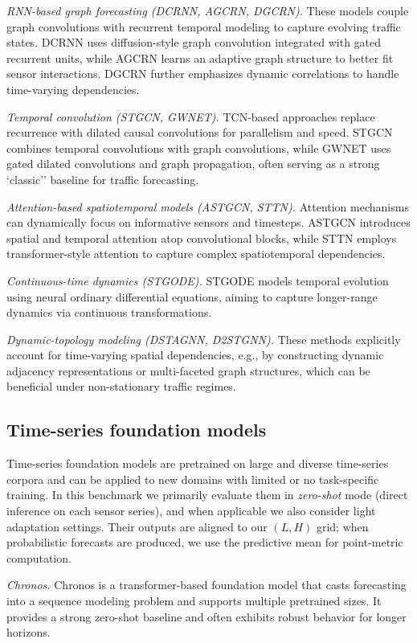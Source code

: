 \documentclass[10pt]{article}
\begin{document}
\textit{RNN-based graph forecasting (DCRNN, AGCRN, DGCRN).}
These models couple graph convolutions with recurrent temporal modeling to capture evolving traffic states.
DCRNN uses diffusion-style graph convolution integrated with gated recurrent units, while AGCRN learns an
adaptive graph structure to better fit sensor interactions. DGCRN further emphasizes dynamic correlations to
handle time-varying dependencies.

\textit{Temporal convolution (STGCN, GWNET).}
TCN-based approaches replace recurrence with dilated causal convolutions for parallelism and speed.
STGCN combines temporal convolutions with graph convolutions, while GWNET uses gated dilated convolutions
and graph propagation, often serving as a strong `classic'' baseline for traffic forecasting.

\textit{Attention-based spatiotemporal models (ASTGCN, STTN).}
Attention mechanisms can dynamically focus on informative sensors and timesteps.
ASTGCN introduces spatial and temporal attention atop convolutional blocks, while STTN employs transformer-style
attention to capture complex spatiotemporal dependencies.

\textit{Continuous-time dynamics (STGODE).}
STGODE models temporal evolution using neural ordinary differential equations, aiming to capture longer-range
dynamics via continuous transformations.

\textit{Dynamic-topology modeling (DSTAGNN, D2STGNN).}
These methods explicitly account for time-varying spatial dependencies, e.g., by constructing dynamic adjacency
representations or multi-faceted graph structures, which can be beneficial under non-stationary traffic regimes.

\subsection{Time-series foundation models}
Time-series foundation models are pretrained on large and diverse time-series corpora and can be applied to
new domains with limited or no task-specific training. In this benchmark we primarily evaluate them in
\emph{zero-shot} mode (direct inference on each sensor series), and when applicable we also consider light
adaptation settings. Their outputs are aligned to our $(L,H)$ grid; when probabilistic forecasts are produced,
we use the predictive mean for point-metric computation.

\textit{Chronos.}
Chronos is a transformer-based foundation model that casts forecasting into a sequence modeling problem and
supports multiple pretrained sizes. It provides a strong zero-shot baseline and often exhibits robust behavior
for longer horizons.
\end{document}
